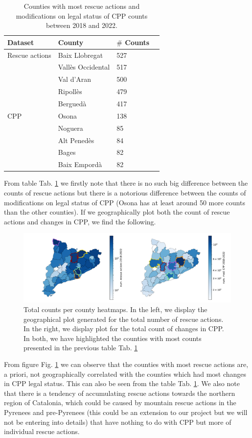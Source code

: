 \documentclass[
  journal=small,
  manuscript=mini-article,  %
  year=2023,
  volume=1,
]{odj-journal}
\begin{document}
\begin{longtable}{p{2.5cm}p{2.5cm}p{2.5cm}p{2.5cm}}
  \caption{Counties with most rescue actions and modifications on legal status of CPP counts between 2018 and 2022.}\label{tab:tab1}\\
  \toprule
  \textbf{Dataset} & \textbf{County} & \textbf{$\#$ Counts} \\
  \midrule
  \endhead
  \midrule
  \endfoot
  Rescue actions & Baix Llobregat & 527 \\
   & Vallès Occidental & 517 \\
   & Val d'Aran & 500 \\
   & Ripollès & 479 \\
   & Berguedà & 417 \\
  \midrule
  CPP & Osona & 138 \\
   & Noguera & 85 \\
   & Alt Penedès & 84 \\
   & Bages & 82 \\
   & Baix Empordà & 82 \\
  \bottomrule
\end{longtable}
From table Tab. \ref{tab:tab1} we firstly note that there is no such big difference between the counts of rescue actions but there is a notorious difference between the counts of modifications on legal status of CPP (Osona has at least  around 50 more counts than the other counties). If we geographically plot both the count of rescue actions and changes in CPP, we find the following.

\begin{figure}[hbt!]
\centering
\includegraphics[width=1\linewidth]{../figures/merged_maps_plot}
\caption{Total counts per county heatmaps. In the left, we display the geographical plot generated for the total number of rescue actions. In the right, we display plot for the total count of changes in CPP. In both, we have highlighted the counties with most counts presented in the previous table Tab. \ref{tab:tab1}}
\label{fig:fig1}
\end{figure}
From figure Fig. \ref{fig:fig1} we can observe that the counties with most rescue actions are, a priori, not geographically correlated with the counties which had most changes in CPP legal status. This can also be seen from the table Tab. \ref{tab:tab1}. We also note that there is a tendency of accumulating rescue actions towards the northern region of Catalonia, which could be caused by mountain rescue actions in the Pyrenees and pre-Pyrenees (this could be an extension to our project but we will not be entering into details) that have nothing to do with CPP but more of individual rescue actions.
\end{document}
